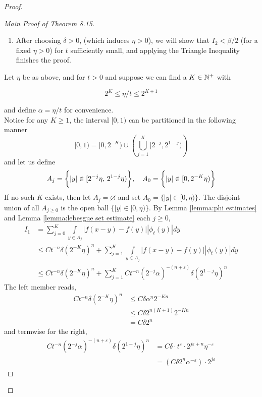 \documentclass[../../main.tex]{subfiles}
\begin{document}
\begin{proof}
\begin{proof}[Main Proof of Theorem 8.15]
\begin{enumerate}
        \item After choosing $\delta>0$, (which induces $\eta>0$), we will show that $I_2<\beta/2$ (for a fixed $\eta>0$) for $t$ sufficiently small, and applying the Triangle Inequality finishes the proof.
    \end{enumerate}
    Let $\eta$ be as above, and for $t>0$ and suppose we can find a $K\in\mathbb{N}^+$ with

    \begin{equation}\label{alpha estimate}
    2^K\leq \eta/t\leq 2^{K+1}
    \end{equation}

    and define $\alpha = \eta/t$ for convenience.\\

    Notice for any $K\geq 1$, the interval $[0,1)$ can be partitioned in the following manner\[[0,1)=[0,2^{-K})\cup\left(\bigcup\limits_{j=1}^K[2^{-j},2^{1-j})\right)\]
    and let us define 
    \[A_j = \biggl\{{|y|\in[2^{-j}\eta,\,2^{1-j}\eta)}\biggr\},\quad A_0 = \biggl\{{|y|\in[0,2^{-K}\eta)}\biggr\}\]
    If no such $K$ exists, then let $A_j=\varnothing$ and set $A_0 = \{|y|\in[0,\eta)\}$. The disjoint union of all $A_{j\geq 0}$ is the open ball $\{|y|\in[0,\eta)\}$. By Lemma \ref{lemma:phi estimates} and Lemma \ref{lemma:lebesgue set estimate} each $j\geq 0$,
    \begin{align*}
        I_1&= \sum_{j=0}^K\int\limits_{y\in A_j}|f(x-y)-f(y)||\phi_t(y)|dy\\[2ex]
        &\leq Ct^{-n}\delta(2^{-K}\eta)^n + \sum_{j=1}^K\int\limits_{y\in A_j}|f(x-y)-f(y)||\phi_t(y)|dy\\[2ex]
        &\leq Ct^{-n}\delta(2^{-K}\eta)^n + \sum_{j=1}^K Ct^{-n}(2^{-j}\alpha)^{-(n+\varepsilon)}\delta(2^{1-j}\eta)^n
    \end{align*}
    The left member reads, 
    \begin{align*}
        Ct^{-n}\delta(2^{-K}\eta)^n&\leq C\delta\alpha^n2^{-Kn}\\
        &\leq C\delta 2^{n(K+1)}2^{-Kn}\\
        &=C\delta 2^n
    \end{align*}
    and termwise for the right,
    \begin{align*}
        Ct^{-n}(2^{-j}\alpha)^{-(n+\varepsilon)}\delta(2^{1-j}\eta)^n &= C\delta\cdot t^{\varepsilon}\cdot 2^{j\varepsilon+n}\eta^{-\varepsilon}\\
        &= (C\delta 2^n\alpha^{-\varepsilon})\cdot 2^{j\varepsilon}
    \end{align*}

\end{proof}
\end{proof}
\end{document}

